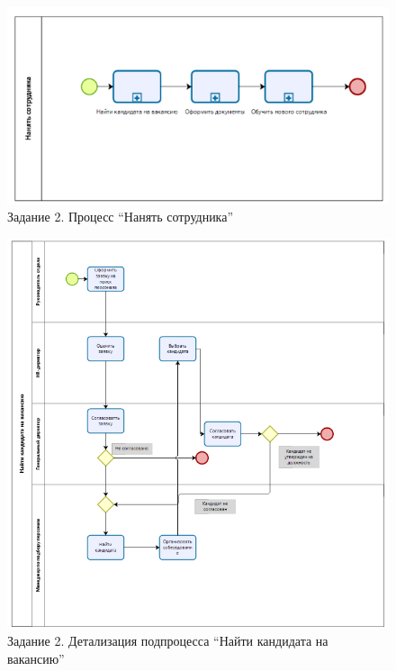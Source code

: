 \documentclass[a4paper,14pt]{extarticle}
\begin{document}
	\begin{figure}[htpb]
	\centering
	\includegraphics[width=0.5\linewidth]{images/pr10-emp1}
	\caption{Задание 2. Процесс “Нанять сотрудника”}
	\label{fig:pr10-emp1}
\end{figure}
	\begin{figure}[htb]
	\centering
	\includegraphics[width=0.55\linewidth]{images/pr10-emp2}
	\caption{Задание 2. Детализация подпроцесса “Найти кандидата на вакансию”}
	\label{fig:pr10-emp2}
\end{figure}
\end{document}
